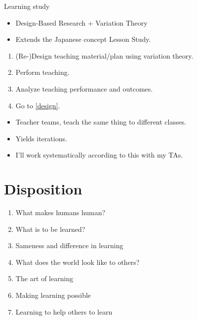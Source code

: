 \begin{frame}
  \begin{block}{Learning study~\cite{LearningStudy}}
    \begin{itemize}
      \item Design-Based Research + Variation Theory
      \item Extends the Japanese concept Lesson Study.
    \end{itemize}
    \pause
    \begin{enumerate}
      \item \label{design} (Re-)Design teaching material/plan using variation 
        theory.
      \item Perform teaching.
      \item Analyze teaching performance and outcomes.
      \item Go to \ref{design}.
    \end{enumerate}
  \end{block}

  \pause

  \begin{remark}
    \begin{itemize}
      \item Teacher teams, teach the same thing to different classes.
      \item Yields iterations.
    \end{itemize}
  \end{remark}
\end{frame}

\begin{frame}
  \begin{example}
    \begin{itemize}
      \item I'll work systematically according to this with my TAs.
    \end{itemize}
  \end{example}
\end{frame}

\section{Disposition}

\begin{frame}
  \begin{enumerate}
    \item What makes humans human?
    \item What is to be learned?
    \item Sameness and difference in learning
    \item What does the world look like to others?
    \item The art of learning
    \item Making learning possible
    \item Learning to help others to learn
  \end{enumerate}
\end{frame}

